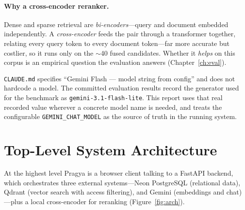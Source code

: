 \documentclass[11pt,a4paper,oneside]{report}
\newcommand{\code}[1]{\texttt{#1}}
\begin{document}
\paragraph{Why a cross-encoder reranker.} Dense and sparse retrieval are \emph{bi-encoders}---query
and document embedded independently. A \emph{cross-encoder} feeds the pair through a transformer
together, relating every query token to every document token---far more accurate but costlier, so
it runs only on the $\sim$40 fused candidates. Whether it \emph{helps} on this corpus is an
empirical question the evaluation answers (Chapter~\ref{ch:eval}).

\begin{divergence}
\code{CLAUDE.md} specifies ``Gemini Flash --- model string from config'' and does not hardcode a
model. The committed evaluation results record the generator used for the benchmark as
\code{gemini-3.1-flash-lite}. This report uses that real recorded value wherever a concrete model
name is needed, and treats the configurable \code{GEMINI\_CHAT\_MODEL} as the source of truth in
the running system.
\end{divergence}

\section{Top-Level System Architecture}
At the highest level Pragya is a browser client talking to a FastAPI backend, which orchestrates
three external systems---Neon PostgreSQL (relational data), Qdrant (vector search with access
filtering), and Gemini (embeddings and chat)---plus a local cross-encoder for reranking
(Figure~\ref{fig:arch}).
\end{document}
